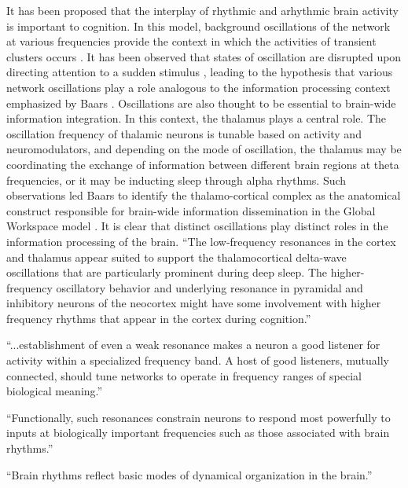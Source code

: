 \documentclass[twocolumn]{article}
\begin{document}
It has been proposed that the interplay of rhythmic and arhythmic brain activity is important to cognition. In this model, background oscillations of the network at various frequencies provide the context in which the activities of transient clusters occurs \cite{ll1988,others}. It has been observed that states of oscillation are disrupted upon directing attention to a sudden stimulus \cite{bu2006}, leading to the hypothesis that various network oscillations play a role analogous to the information processing context emphasized by Baars \cite{ba1988}. Oscillations are also thought to be essential to brain-wide information integration. In this context, the thalamus plays a central role. The oscillation frequency of thalamic neurons is tunable based on activity and neuromodulators, and depending on the mode of oscillation, the thalamus may be coordinating the exchange of information between different brain regions at theta frequencies, or it may be inducting sleep through alpha rhythms. Such observations led Baars to identify the thalamo-cortical complex as the anatomical construct responsible for brain-wide information dissemination in the Global Workspace model \cite{ba1988}. It is clear that distinct oscillations play distinct roles in the information processing of the brain. ``The low-frequency resonances in the cortex and thalamus appear suited to support the thalamocortical delta-wave oscillations that are particularly prominent during deep sleep. The higher-frequency oscillatory behavior and underlying resonance in pyramidal and inhibitory neurons of the neocortex might have some involvement with higher frequency rhythms that appear in the cortex during cognition.'' \cite{huya2000}

\vspace{3em}
``...establishment of even a weak resonance makes a neuron a good listener for activity within a specialized frequency band. A host of good listeners, mutually connected, should tune networks to operate in frequency ranges of special biological meaning.'' \cite{huya2000}



\vspace{3em}
``Functionally, such resonances constrain neurons to respond most powerfully to inputs at biologically important frequencies such as those associated with brain rhythms.'' \cite{huya2000}

\vspace{3em}
``Brain rhythms reflect basic modes of dynamical organization in the brain.'' \cite{huya2000}
\end{document}
